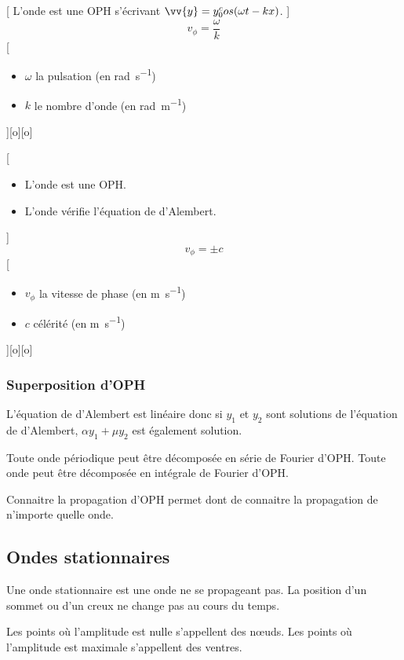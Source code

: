 [
    L'onde est une OPH s'écrivant $\vv{y}=y_0^cos(\omega t - k x)$.
]
{
    $$v_\phi=\frac{\omega}{k}$$
}
[
    \begin{itemize}
        \item $\omega$ la pulsation (en \unit{rad.s^{-1}})
        \item $k$ le nombre d'onde (en \unit{rad.m^{-1}})
    \end{itemize}
][o][o]

[
    \begin{itemize}
        \item L'onde est une OPH.
        \item L'onde vérifie l'équation de d'Alembert.
    \end{itemize}
]
{
    $$v_\phi=\pm c$$
}
[
    \begin{itemize}
        \item $v_\phi$ la vitesse de phase (en \unit{m.s^{-1}})
        \item $c$ célérité (en \unit{m.s^{-1}})
    \end{itemize}
][o][o]

\subsubsection{Superposition d'OPH}
L'équation de d'Alembert est linéaire donc si $y_1$ et $y_2$ sont solutions de l'équation de d'Alembert, $\alpha y_1+\mu y_2$ est également solution.

Toute onde périodique peut être décomposée en série de Fourier d'OPH.
Toute onde peut être décomposée en intégrale de Fourier d'OPH.

Connaitre la propagation d'OPH permet dont de connaitre la propagation de n'importe quelle onde.

\subsection{Ondes stationnaires}%
Une onde stationnaire est une onde ne se propageant pas. La position d'un sommet ou d'un creux ne change pas au cours du temps.

Les points où l'amplitude est nulle s'appellent des nœuds.
Les points où l'amplitude est maximale s'appellent des ventres.

